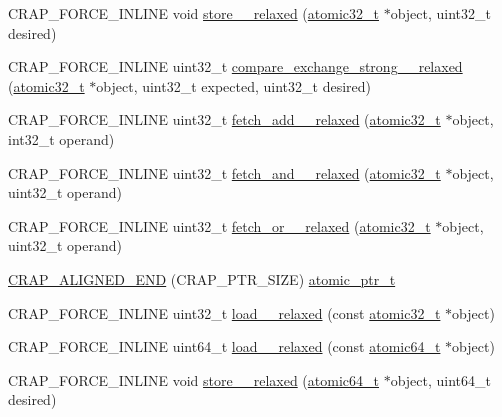 \begin{DoxyCompactItemize}
\item 
C\+R\+A\+P\+\_\+\+F\+O\+R\+C\+E\+\_\+\+I\+N\+L\+I\+N\+E void \hyperlink{namespacecrap_abdf1a4e0b894938d55bc854bc207d039}{store\+\_\+\_\+relaxed} (\hyperlink{structcrap_1_1atomic32__t}{atomic32\+\_\+t} $\ast$object, uint32\+\_\+t desired)
\item 
C\+R\+A\+P\+\_\+\+F\+O\+R\+C\+E\+\_\+\+I\+N\+L\+I\+N\+E uint32\+\_\+t \hyperlink{namespacecrap_a8010c6cfcff3229a2aa4511002d9c672}{compare\+\_\+exchange\+\_\+strong\+\_\+\_\+relaxed} (\hyperlink{structcrap_1_1atomic32__t}{atomic32\+\_\+t} $\ast$object, uint32\+\_\+t expected, uint32\+\_\+t desired)
\item 
C\+R\+A\+P\+\_\+\+F\+O\+R\+C\+E\+\_\+\+I\+N\+L\+I\+N\+E uint32\+\_\+t \hyperlink{namespacecrap_a2dd42a305bc39919d5915ac0d398c4bb}{fetch\+\_\+add\+\_\+\_\+relaxed} (\hyperlink{structcrap_1_1atomic32__t}{atomic32\+\_\+t} $\ast$object, int32\+\_\+t operand)
\item 
C\+R\+A\+P\+\_\+\+F\+O\+R\+C\+E\+\_\+\+I\+N\+L\+I\+N\+E uint32\+\_\+t \hyperlink{namespacecrap_a63b98efafd219a067ccc4bfba4781f72}{fetch\+\_\+and\+\_\+\_\+relaxed} (\hyperlink{structcrap_1_1atomic32__t}{atomic32\+\_\+t} $\ast$object, uint32\+\_\+t operand)
\item 
C\+R\+A\+P\+\_\+\+F\+O\+R\+C\+E\+\_\+\+I\+N\+L\+I\+N\+E uint32\+\_\+t \hyperlink{namespacecrap_a0fd9d33eff0a47c045195ce30be2a59b}{fetch\+\_\+or\+\_\+\_\+relaxed} (\hyperlink{structcrap_1_1atomic32__t}{atomic32\+\_\+t} $\ast$object, uint32\+\_\+t operand)
\item 
\hyperlink{namespacecrap_a6acc358362a824e62491747f7a0b2d81}{C\+R\+A\+P\+\_\+\+A\+L\+I\+G\+N\+E\+D\+\_\+\+E\+N\+D} (C\+R\+A\+P\+\_\+\+P\+T\+R\+\_\+\+S\+I\+Z\+E) \hyperlink{structcrap_1_1atomic__ptr__t}{atomic\+\_\+ptr\+\_\+t}
\item 
C\+R\+A\+P\+\_\+\+F\+O\+R\+C\+E\+\_\+\+I\+N\+L\+I\+N\+E uint32\+\_\+t \hyperlink{namespacecrap_a07cb414f50be2b88d80ea9ae8c119ebb}{load\+\_\+\_\+relaxed} (const \hyperlink{structcrap_1_1atomic32__t}{atomic32\+\_\+t} $\ast$object)
\item 
C\+R\+A\+P\+\_\+\+F\+O\+R\+C\+E\+\_\+\+I\+N\+L\+I\+N\+E uint64\+\_\+t \hyperlink{namespacecrap_a8cd2d556f287527a3a82cdd4a55a6bd8}{load\+\_\+\_\+relaxed} (const \hyperlink{structcrap_1_1atomic64__t}{atomic64\+\_\+t} $\ast$object)
\item 
C\+R\+A\+P\+\_\+\+F\+O\+R\+C\+E\+\_\+\+I\+N\+L\+I\+N\+E void \hyperlink{namespacecrap_a28376b5dab77719f595c33cd6488f93d}{store\+\_\+\_\+relaxed} (\hyperlink{structcrap_1_1atomic64__t}{atomic64\+\_\+t} $\ast$object, uint64\+\_\+t desired)

\end{DoxyCompactItemize}
